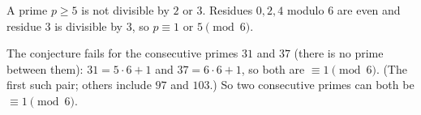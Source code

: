 A prime $p\ge5$ is not divisible by $2$ or $3$. Residues $0,2,4$ modulo $6$ are even and residue $3$ is divisible by $3$, so $p\equiv1$ or $5\pmod6$.

The conjecture fails for the consecutive primes $31$ and $37$ (there is no prime between them): $31=5\cdot6+1$ and $37=6\cdot6+1$, so both are $\equiv1\pmod6$. (The first such pair; others include $97$ and $103$.) So two consecutive primes can both be $\equiv1\pmod6$.
